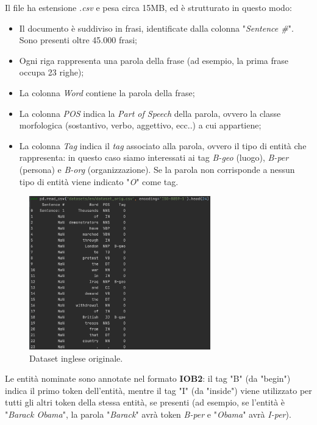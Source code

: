 \documentclass[a4paper,11pt]{article}
\begin{document}
Il file ha estensione \textit{.csv} e pesa circa 15MB, ed è strutturato in questo modo:
\begin{itemize}
	\item Il documento è suddiviso in frasi, identificate dalla colonna "\textit{Sentence \#}". Sono presenti oltre 45.000 frasi;
	\item Ogni riga rappresenta una parola della frase (ad esempio, la prima frase occupa 23 righe);
	\item La colonna \textit{Word} contiene la parola della frase;
	\item La colonna \textit{POS} indica la \textit{Part of Speech} della parola, ovvero la classe morfologica (sostantivo, verbo, aggettivo, ecc..) a cui appartiene;
	\item La colonna \textit{Tag} indica il \textit{tag} associato alla parola, ovvero il tipo di entità che rappresenta: in questo caso siamo interessati ai tag \textit{B-geo} (luogo), \textit{B-per} (persona) e \textit{B-org} (organizzazione). Se la parola non corrisponde a nessun tipo di entità viene indicato "\textit{O}" come tag.
\end{itemize}

\begin{figure}[H]
\centering
\includegraphics[width=0.7\textwidth]{img/dataset-en-orig}
\caption{Dataset inglese originale.}
\label{fig:dataset_en_orig}
\end{figure}

Le entità nominate sono annotate nel formato \textbf{IOB2}: il tag "B" (da "begin") indica il primo token dell'entità, mentre il tag "I" (da "inside") viene utilizzato per tutti gli altri token della stessa entità, se presenti (ad esempio, se l'entità è "\textit{Barack Obama}", la parola "\textit{Barack}" avrà token \textit{B-per} e "\textit{Obama}" avrà  \textit{I-per}). 
\newline
\end{document}
